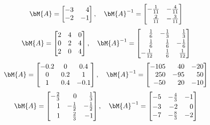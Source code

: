 \begin{align*}
\bM{A}=\begin{bmatrix*}[r] -3&4\\-2&-1  \end{bmatrix*}, \quad \bM{A}^{-1}=\begin{bmatrix*}[r] -\frac{1}{11}&-\frac{4}{11}\\[0.5ex]\frac{2}{11}&-\frac{3}{11} \end{bmatrix*}
\end{align*}
\begin{align*}
\bM{A}=\begin{bmatrix*}[r] 2&4&0\\0&2&4\\2&0&4 \end{bmatrix*},\quad \bM{A}^{-1}=
\begin{bmatrix*}[r] \frac{1}{6}&-\frac{1}{3}&\frac{1}{3}\\[0.5ex]  \frac{1}{6}&\frac{1}{6}&-\frac{1}{6}\\[0.5ex] -\frac{1}{12}&\frac{1}{6}&\frac{1}{12} \end{bmatrix*}
\end{align*}
\begin{align*}
\bM{A}=\begin{bmatrix} -0.2&0&0.4 \\0&0.2&1\\1&0.4&-0.1\end{bmatrix},\quad \bM{A}^{-1}=
\begin{bmatrix*}[r]-105&40&-20\\ 250&-95&50\\-50&20&-10 \end{bmatrix*}
\end{align*}
\begin{align*}
\bM{A}=\begin{bmatrix*}[r] -\frac{2}{3}&0&\frac{1}{3}\\[0.5ex] 1&-\frac{1}{2}&-\frac{1}{2}\\[0.5ex] 1&\frac{2}{3}&-1\end{bmatrix*},\quad \bM{A}^{-1}=
\begin{bmatrix*}[r]-5&-\frac{4}{3}&-1\\[0.5ex] -3&-2&0\\-7&-\frac{8}{3}&-2 \end{bmatrix*}
\end{align*}
